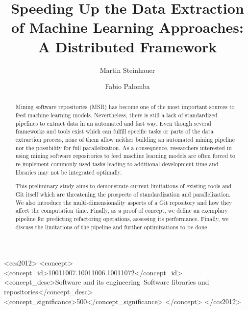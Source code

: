 \documentclass[sigconf,table,screen,xcdraw]{acmart}
\newcommand\iris{\textsc{DisDrillery}\xspace}
\begin{document}
\title[Speeding Up the Data Extraction of Machine Learning Approaches]{Speeding Up the Data Extraction of Machine Learning Approaches: A Distributed Framework}

	\author{Martin Steinhauer}

	\author{Fabio Palomba}

\begin{abstract}
Mining software repositories (MSR) has become one of the most important sources to feed machine learning models. Nevertheless, there is still a lack of standardized pipelines to extract data in an automated and fast way. Even though several frameworks and tools exist which can fulfill specific tasks or parts of the data extraction process, none of them allow neither building an automated mining pipeline nor the possibility for full parallelization. As a consequence, researchers interested in using mining software repositories to feed machine learning models are often forced to re-implement commonly used tasks leading to additional development time and libraries may not be integrated optimally. 

This preliminary study aims to demonstrate current limitations of existing tools and Git itself which are threatening the prospects of standardization and parallelization. We also introduce the multi-dimensionality aspects of a Git repository and how they affect the computation time. Finally, as a proof of concept, we define an exemplary pipeline for predicting refactoring operations, assessing its performance. Finally, we discuss the limitations of the pipeline and further optimizations to be done.\end{abstract}


\begin{CCSXML}
	<ccs2012>
	<concept>
	<concept_id>10011007.10011006.10011072</concept_id>
	<concept_desc>Software and its engineering~Software libraries and repositories</concept_desc>
	<concept_significance>500</concept_significance>
	</concept>
	</ccs2012>
\end{CCSXML}


\maketitle








\balance


\end{document}
